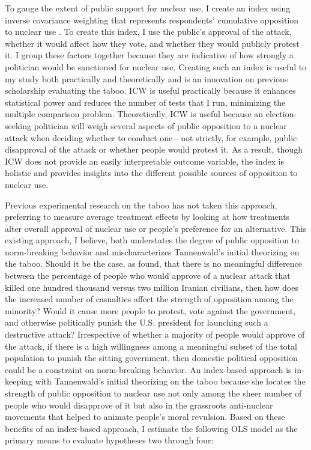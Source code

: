 \documentclass[12pt]{article}
\begin{document}
To gauge the extent of public support for nuclear use, I create an index using inverse covariance weighting that represents respondents' cumulative opposition to nuclear use \citep{anderson_multiple_2008}. To create this index, I use the public's approval of the attack, whether it would affect how they vote, and whether they would publicly protest it. I group these factors together because they are indicative of how strongly a politician would be sanctioned for nuclear use. Creating such an index is useful to my study both practically and theoretically and is an innovation on previous scholarship evaluating the taboo. ICW is useful practically because it enhances statistical power and reduces the number of tests that I run, minimizing the multiple comparison problem. Theoretically, ICW is useful because an election-seeking politician will weigh several aspects of public opposition to a nuclear attack when deciding whether to conduct one—not strictly, for example, public disapproval of the attack or whether people would protest it. As a result, though ICW does not provide an easily interpretable outcome variable, the index is holistic and provides insights into the different possible sources of opposition to nuclear use. 

Previous experimental research on the taboo has not taken this approach, preferring to measure average treatment effects by looking at how treatments alter overall approval of nuclear use or people's preference for an alternative. This existing approach, I believe, both understates the degree of public opposition to norm-breaking behavior and mischaracterizes Tannenwald's initial theorizing on the taboo. Should it be the case, as \citet{sagan_revisiting_2017} found, that there is no meaningful difference between the percentage of people who would approve of a nuclear attack that killed one hundred thousand versus two million Iranian civilians, then how does the increased number of casualties affect the strength of opposition among the minority? Would it cause more people to protest, vote against the government, and otherwise politically punish the U.S. president for launching such a destructive attack? Irrespective of whether a majority of people would approve of the attack, if there is a high willingness among a meaningful subset of the total population to punish the sitting government, then domestic political opposition could be a constraint on norm-breaking behavior. An index-based approach is in-keeping with Tannenwald's initial theorizing on the taboo because she locates the strength of public opposition to nuclear use not only among the sheer number of people who would disapprove of it but also in the grassroots anti-nuclear movements that helped to animate people's moral revulsion. Based on these benefits of an index-based approach, I estimate the following OLS model as the primary means to evaluate hypotheses two through four:
\end{document}
